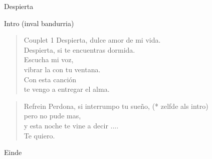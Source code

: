 \begin{song}[tango]{Despierta}


\begin{instrumental}{Intro \textnormal{(inval bandurria)}}
    
\measure{}   
\end{instrumental}{}

\begin{verse}{Couplet 1}
  Despierta, dulce amor de mi vida.\\
  Despierta, si te encuentras dormida. \\
  Escucha mi voz, \chord{}   \\
  vibrar la con tu ventana.  \\
  Con esta canci\'{o}n \chord{}   \\
  te vengo a entregar el alma.
\end{verse}

\begin{verse}{Refrein}
  Perdona, \hspace{4em} si interrumpo tu sue\~{n}o,  \hspace{3em} (* zelfde als intro)\\
  pero no pude mas,  \\
  y esta noche te vine a decir ....  \\
  Te quiero.
\end{verse}


\begin{instrumental}{Einde}
\end{instrumental}

\end{song}

